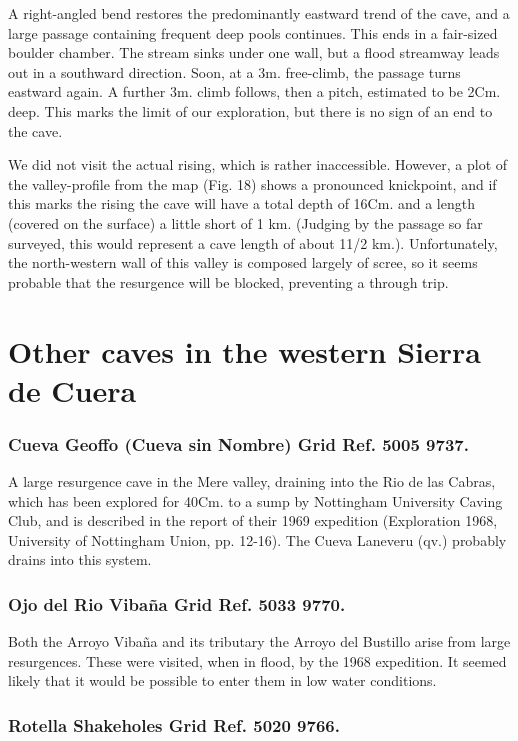 \documentclass[11pt, a4paper, twoside]{memoir}
\begin{document}
A right-angled bend restores the predominantly eastward trend of the cave, and a large passage containing frequent deep pools continues. This ends in a fair-sized boulder chamber. The stream sinks under one wall, but a flood streamway leads out in a southward direction. Soon, at a 3m. free-climb, the passage turns eastward again. A further 3m. climb follows, then a pitch, estimated to be 2Cm. deep. This marks the limit of our exploration, but there is no sign of an end to the cave.

We did not visit the actual rising, which is rather inaccessible. However, a plot of the valley-profile from the map (Fig. 18) shows a pronounced knickpoint, and if this marks the rising the cave will have a total depth of 16Cm. and a length (covered on the surface) a little short of 1 km. (Judging by the passage so far surveyed, this would represent a cave length of about 11/2 km.). Unfortunately, the north-western wall of this valley is composed largely of scree, so it seems probable that the resurgence will be blocked, preventing a through trip.


\chapter{Other caves in the western Sierra de Cuera}

\subsection*{Cueva Geoffo (Cueva sin Nombre) Grid Ref. 5005 9737.}

A large resurgence cave in the Mere valley, draining into the Rio de las Cabras, which has been explored for 40Cm. to a sump by Nottingham University Caving Club, and is described in the report of their 1969 expedition (Exploration 1968, University of Nottingham Union, pp. 12-16). The Cueva Laneveru (qv.) probably drains into this system.

\subsection*{Ojo del Rio Vibaña Grid Ref. 5033 9770.}

Both the Arroyo Vibaña and its tributary the Arroyo del Bustillo arise from large resurgences. These were visited, when in flood, by the 1968 expedition. It seemed likely that it would be possible to enter them in low water conditions.

\subsection*{Rotella Shakeholes Grid Ref. 5020 9766.}
\end{document}
